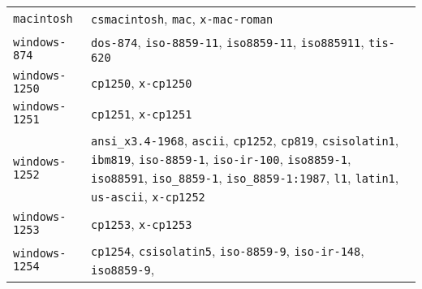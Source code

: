 \begin{longtable}[]{@{}
  >{\raggedright\arraybackslash}p{}
  >{\raggedright\arraybackslash}p{}@{}}
\texttt{\textquotesingle{}macintosh\textquotesingle{}} &
\texttt{\textquotesingle{}csmacintosh\textquotesingle{}},
\texttt{\textquotesingle{}mac\textquotesingle{}},
\texttt{\textquotesingle{}x-mac-roman\textquotesingle{}} \\
\texttt{\textquotesingle{}windows-874\textquotesingle{}} &
\texttt{\textquotesingle{}dos-874\textquotesingle{}},
\texttt{\textquotesingle{}iso-8859-11\textquotesingle{}},
\texttt{\textquotesingle{}iso8859-11\textquotesingle{}},
\texttt{\textquotesingle{}iso885911\textquotesingle{}},
\texttt{\textquotesingle{}tis-620\textquotesingle{}} \\
\texttt{\textquotesingle{}windows-1250\textquotesingle{}} &
\texttt{\textquotesingle{}cp1250\textquotesingle{}},
\texttt{\textquotesingle{}x-cp1250\textquotesingle{}} \\
\texttt{\textquotesingle{}windows-1251\textquotesingle{}} &
\texttt{\textquotesingle{}cp1251\textquotesingle{}},
\texttt{\textquotesingle{}x-cp1251\textquotesingle{}} \\
\texttt{\textquotesingle{}windows-1252\textquotesingle{}} &
\texttt{\textquotesingle{}ansi\_x3.4-1968\textquotesingle{}},
\texttt{\textquotesingle{}ascii\textquotesingle{}},
\texttt{\textquotesingle{}cp1252\textquotesingle{}},
\texttt{\textquotesingle{}cp819\textquotesingle{}},
\texttt{\textquotesingle{}csisolatin1\textquotesingle{}},
\texttt{\textquotesingle{}ibm819\textquotesingle{}},
\texttt{\textquotesingle{}iso-8859-1\textquotesingle{}},
\texttt{\textquotesingle{}iso-ir-100\textquotesingle{}},
\texttt{\textquotesingle{}iso8859-1\textquotesingle{}},
\texttt{\textquotesingle{}iso88591\textquotesingle{}},
\texttt{\textquotesingle{}iso\_8859-1\textquotesingle{}},
\texttt{\textquotesingle{}iso\_8859-1:1987\textquotesingle{}},
\texttt{\textquotesingle{}l1\textquotesingle{}},
\texttt{\textquotesingle{}latin1\textquotesingle{}},
\texttt{\textquotesingle{}us-ascii\textquotesingle{}},
\texttt{\textquotesingle{}x-cp1252\textquotesingle{}} \\
\texttt{\textquotesingle{}windows-1253\textquotesingle{}} &
\texttt{\textquotesingle{}cp1253\textquotesingle{}},
\texttt{\textquotesingle{}x-cp1253\textquotesingle{}} \\
\texttt{\textquotesingle{}windows-1254\textquotesingle{}} &
\texttt{\textquotesingle{}cp1254\textquotesingle{}},
\texttt{\textquotesingle{}csisolatin5\textquotesingle{}},
\texttt{\textquotesingle{}iso-8859-9\textquotesingle{}},
\texttt{\textquotesingle{}iso-ir-148\textquotesingle{}},
\texttt{\textquotesingle{}iso8859-9\textquotesingle{}},

\end{longtable}
